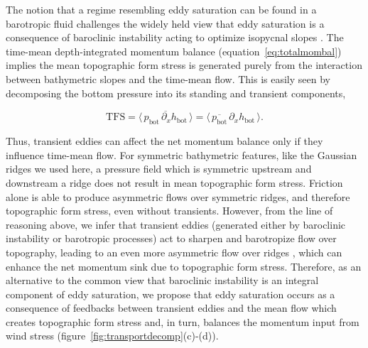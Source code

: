\documentclass{agujournal2019}
\newcommand{\tfs} {\mathrm{TFS}}
\newcommand{\hb} {h_{\mathrm{bot}}}
\newcommand{\pb} {p_{\mathrm{bot}}}
\begin{document}
The notion that a regime resembling eddy saturation can be found in a barotropic fluid challenges the widely held view that eddy saturation is a consequence of baroclinic instability acting to optimize isopycnal slopes \cite{Straub-1993,Marshall-etal-2017}. The time-mean depth-integrated momentum balance (equation~\eqref{eq:totalmombal}) implies the mean topographic form stress is generated purely from the interaction between bathymetric slopes and the time-mean flow. This is easily seen by decomposing the bottom pressure into its standing and transient components, 
\begin{linenomath*}
\begin{equation}
\tfs = \big\langle\, \overline{\pb\,\partial_x{\hb}}\,\big\rangle = \big\langle\, \overline{\pb}\,\partial_x{\hb}\,\big\rangle.
\end{equation}
\end{linenomath*}
Thus, transient eddies can affect the net momentum balance only if they influence time-mean flow. For symmetric bathymetric features, like the Gaussian ridges we used here, a pressure field which is symmetric upstream and downstream a ridge does not result in mean topographic form stress. {\color{black}Friction alone is able to produce asymmetric flows over symmetric ridges, and therefore topographic form stress, even without transients. However, from the line of reasoning above}, we infer that transient eddies (generated either by baroclinic instability or barotropic processes) act to sharpen and barotropize flow over topography, leading to {\color{black}an even more} asymmetric flow over ridges \cite{Youngs-etal-2017}, which can enhance the net momentum sink due to topographic form stress.  Therefore, as an alternative to the common view that baroclinic instability is an integral component of eddy saturation, we propose that eddy saturation occurs as a consequence of feedbacks between transient eddies and the mean flow which creates topographic form stress and, in turn, balances the momentum input from wind stress (figure~\ref{fig:transportdecomp}\mbox{(c)-(d)}).





\end{document}

